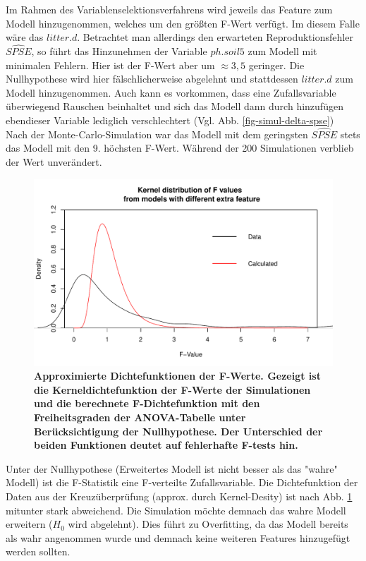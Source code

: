 Im Rahmen des Variablenselektionsverfahrens wird jeweils das Feature zum Modell hinzugenommen, welches um den größten F-Wert verfügt.
Im diesem Falle wäre das $litter.d$.
Betrachtet man allerdings den erwarteten Reproduktionsfehler $\widehat{SPSE}$, so führt das Hinzunehmen der Variable $ph.soil5$ zum Modell mit minimalen Fehlern.
Hier ist der F-Wert aber um $\approx 3,5$ geringer.
Die Nullhypothese wird hier fälschlicherweise abgelehnt und stattdessen $litter.d$ zum Modell hinzugenommen.
Auch kann es vorkommen, dass eine Zufallsvariable überwiegend Rauschen beinhaltet und sich das Modell dann durch hinzufügen ebendieser Variable lediglich verschlechtert (Vgl. Abb. \ref{fig-simul-delta-spse})
\\
Nach der Monte-Carlo-Simulation war das Modell mit dem geringsten $\widehat{SPSE}$ stets das Modell mit den 9. höchsten F-Wert.
Während der 200 Simulationen verblieb der Wert unverändert.
\\
\begin{figure}[htbp]
	\centering
	\includegraphics[width=\textwidth]{fig/simul/kernel.pdf}
	\caption{\bf{Approximierte Dichtefunktionen der F-Werte.} 
		Gezeigt ist die Kerneldichtefunktion der F-Werte der Simulationen und die berechnete F-Dichtefunktion mit den Freiheitsgraden der ANOVA-Tabelle unter Berücksichtigung der Nullhypothese.
		Der Unterschied der beiden Funktionen deutet auf fehlerhafte F-tests hin.
	}
	\label{fig-simul-kernel}
\end{figure}

Unter der Nullhypothese (Erweitertes Modell ist nicht besser als das "wahre" Modell) ist die F-Statistik eine F-verteilte Zufallsvariable.
Die Dichtefunktion der Daten aus der Kreuzüberprüfung (approx. durch Kernel-Desity) ist nach Abb. \ref{fig-simul-kernel} mitunter stark abweichend.
Die Simulation möchte demnach das wahre Modell erweitern ($H_0$ wird abgelehnt).
Dies führt zu Overfitting, da das Modell bereits als wahr angenommen wurde und demnach keine weiteren Features hinzugefügt werden sollten.

